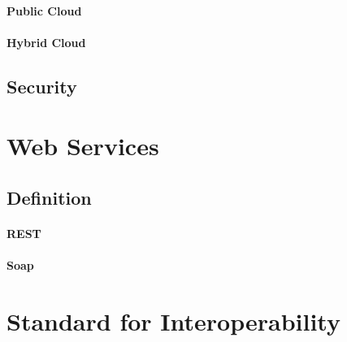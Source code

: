 \paragraph{Public Cloud}
\label{paragraph:Public Cloud}
\paragraph{Hybrid Cloud}
\label{paragraph:Hybrid Cloud}
\subsection{Security}

\section{Web Services}
\subsection{Definition}
\paragraph{REST}
\label{paragraph:REST}
\paragraph{Soap}
\label{paragraph:Soap}





\section{Standard for Interoperability}
